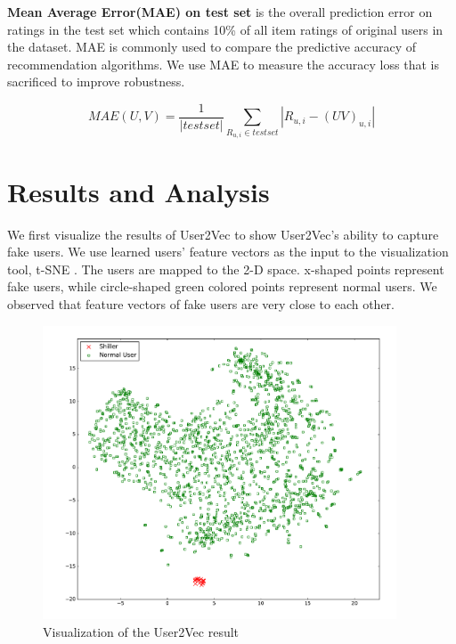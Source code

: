 \documentclass[master,english,final]{kaist-ucs}
\begin{document}
\textbf{Mean Average Error(MAE) on test set} is the overall prediction error on ratings in the test set which contains 10\% of all item ratings of original users in the dataset.
MAE is commonly used to compare the predictive accuracy of recommendation algorithms.
We use MAE to measure the accuracy loss that is sacrificed to improve robustness.

\begin{equation}
MAE(U,V) = \frac{1}{|test set|} \sum_{R_{u,i} \in test set} |R_{u,i}-(UV)_{u,i}|
\end{equation}



\section{Results and Analysis}
We first visualize the results of User2Vec to show User2Vec's ability to capture fake users.
We use learned users' feature vectors as the input to the visualization tool, t-SNE \cite{TSNE}.
The users are mapped to the 2-D space.
x-shaped points represent fake users, while circle-shaped green colored points represent normal users.
We observed that feature vectors of fake users are very close to each other.
\begin{figure}[t]
    \centerline{\includegraphics[width=10.5cm]{figure/user2vec_result.pdf}}
    \caption{  Visualization of the User2Vec result } \label{user2vec_result}
\end{figure}

\end{document}
